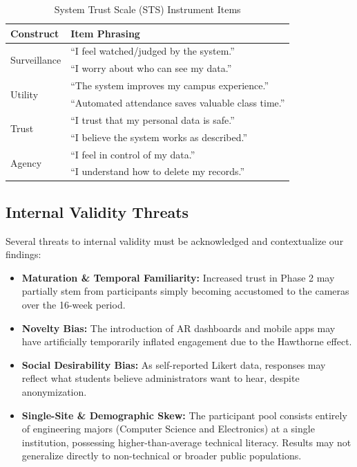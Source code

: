 \documentclass[conference]{IEEEtran}
\begin{document}
\begin{table}[htbp]
\caption{System Trust Scale (STS) Instrument Items}
\begin{center}
\begin{tabular}{lp{6cm}}
\toprule
\textbf{Construct} & \textbf{Item Phrasing} \\
\midrule
\multirow{2}{*}{Surveillance} & ``I feel watched/judged by the system.'' \\
& ``I worry about who can see my data.'' \\
\midrule
\multirow{2}{*}{Utility} & ``The system improves my campus experience.'' \\
& ``Automated attendance saves valuable class time.'' \\
\midrule
\multirow{2}{*}{Trust} & ``I trust that my personal data is safe.'' \\
& ``I believe the system works as described.'' \\
\midrule
\multirow{2}{*}{Agency} & ``I feel in control of my data.'' \\
& ``I understand how to delete my records.'' \\
\bottomrule
\end{tabular}
\end{center}
\label{tab:survey}
\end{table}

\subsection{Internal Validity Threats}
Several threats to internal validity must be acknowledged and contextualize our findings:
\begin{itemize}
    \item \textbf{Maturation \& Temporal Familiarity:} Increased trust in Phase 2 may partially stem from participants simply becoming accustomed to the cameras over the 16-week period.
    \item \textbf{Novelty Bias:} The introduction of AR dashboards and mobile apps may have artificially temporarily inflated engagement due to the Hawthorne effect.
    \item \textbf{Social Desirability Bias:} As self-reported Likert data, responses may reflect what students believe administrators want to hear, despite anonymization.
    \item \textbf{Single-Site \& Demographic Skew:} The participant pool consists entirely of engineering majors (Computer Science and Electronics) at a single institution, possessing higher-than-average technical literacy. Results may not generalize directly to non-technical or broader public populations.
\end{itemize}
\end{document}

